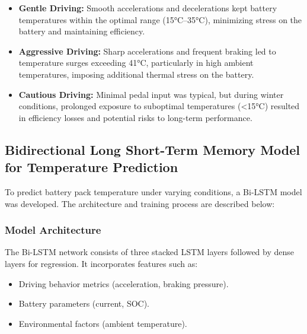 \begin{itemize}
    \item \textbf{Gentle Driving:} Smooth accelerations and decelerations kept battery temperatures within the optimal range (15°C–35°C), minimizing stress on the battery and maintaining efficiency.
    \item \textbf{Aggressive Driving:} Sharp accelerations and frequent braking led to temperature surges exceeding 41°C, particularly in high ambient temperatures, imposing additional thermal stress on the battery.
    \item \textbf{Cautious Driving:} Minimal pedal input was typical, but during winter conditions, prolonged exposure to suboptimal temperatures (<15°C) resulted in efficiency losses and potential risks to long-term performance.
\end{itemize}



\subsection{Bidirectional Long Short-Term Memory Model for Temperature Prediction}
To predict battery pack temperature under varying conditions, a \gls{Bi-LSTM} model was developed. The architecture and training process are described below:

\subsubsection{Model Architecture}
The \gls{Bi-LSTM} network consists of three stacked LSTM layers followed by dense layers for regression. It incorporates features such as:
\begin{itemize}
    \item Driving behavior metrics (acceleration, braking pressure).
    \item Battery parameters (current, \gls{SOC}).
    \item Environmental factors (ambient temperature).
\end{itemize}

